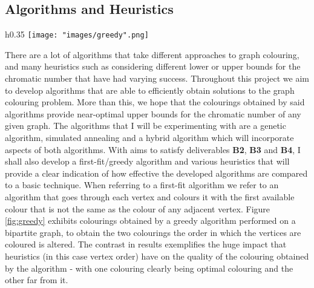 \documentclass[12pt,a4paper]{article}
\begin{document}
\subsection*{Algorithms and Heuristics}
\begin{wrapfigure}{h}{0.35\textwidth}
\texttt{[image: "images/greedy".png]}
\caption{A comparison of two colourings acquired by a greedy algorithm performed on a bipartite graph.}
\label{fig:greedy}
\end{wrapfigure}
\noindent
There are a lot of algorithms that take different approaches to graph colouring, and many heuristics such as considering different lower or upper bounds for the chromatic number that have had varying success. Throughout this project we aim to develop algorithms that are able to efficiently obtain solutions to the graph colouring problem. More than this, we hope that the colourings obtained by said algorithms provide near-optimal upper bounds for the chromatic number of any given graph. The algorithms that I will be experimenting with are a genetic algorithm, simulated annealing and a hybrid algorithm which will incorporate aspects of both algorithms. With aims to satisfy deliverables \textbf{B2}, \textbf{B3} and \textbf{B4}, I shall also develop a first-fit/greedy algorithm and various heuristics that will provide a clear indication of how effective the developed algorithms are compared to a basic technique. When referring to a first-fit algorithm we refer to an algorithm that goes through each vertex and colours it with the first available colour that is not the same as the colour of any adjacent vertex. Figure \ref{fig:greedy} exhibits colourings obtained by a greedy algorithm performed on a bipartite graph, to obtain the two colourings the order in which the vertices are coloured is altered. The contrast in results exemplifies the huge impact that heuristics (in this case vertex order) have on the quality of the colouring obtained by the algorithm - with one colouring clearly being optimal colouring and the other far from it.
\end{document}
